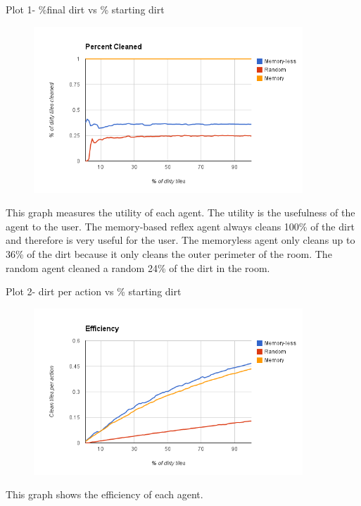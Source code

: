 \documentclass[a4paper,10pt]{article}
\begin{document}
Plot 1- \%final dirt vs \% starting dirt \\
\begin{figure}[H]
	\begin{center}
		\includegraphics[width=0.9\textwidth]{image.png}
	\end{center}
\end{figure}
This graph measures the utility of each agent.
The utility is the usefulness of the agent to the user. 
The memory-based reflex agent always cleans 100\% of the dirt and therefore is very useful for the user.
The memoryless agent only cleans up to 36\% of the dirt because it only cleans the outer perimeter of the room.
The random agent cleaned a random 24\% of the dirt in the room. 

Plot 2- dirt per action vs \% starting dirt
\begin{figure}[H]
	\includegraphics[width=0.9\textwidth]{image1.png}
\end{figure}

This graph shows the efficiency of each agent.
\end{document}
